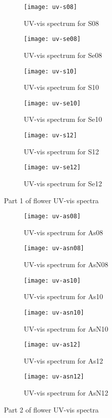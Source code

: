 \begin{figure*}[h]
\centering
\begin{subfigure}{8.25cm}\centering\texttt{[image: uv-s08]}\caption{UV-vis spectrum for S08}\end{subfigure}%
\begin{subfigure}{8.25cm}\centering\texttt{[image: uv-se08]}\caption{UV-vis spectrum for Se08}\end{subfigure}
\begin{subfigure}{8.25cm}\centering\texttt{[image: uv-s10]}\caption{UV-vis spectrum for S10}\end{subfigure}%
\begin{subfigure}{8.25cm}\centering\texttt{[image: uv-se10]}\caption{UV-vis spectrum for Se10}\end{subfigure}
\begin{subfigure}{8.25cm}\centering\texttt{[image: uv-s12]}\caption{UV-vis spectrum for S12}\end{subfigure}%
\begin{subfigure}{8.25cm}\centering\texttt{[image: uv-se12]}\caption{UV-vis spectrum for Se12}\end{subfigure}
\caption[Part 1 of flower UV-vis spectra]{Part 1 of flower UV-vis spectra}
\end{figure*}

\newpage

\begin{figure*}[h]
\centering
\begin{subfigure}{8.25cm}\centering\texttt{[image: uv-as08]}\caption{UV-vis spectrum for As08}\end{subfigure}%
\begin{subfigure}{8.25cm}\centering\texttt{[image: uv-asn08]}\caption{UV-vis spectrum for AsN08}\end{subfigure}
\begin{subfigure}{8.25cm}\centering\texttt{[image: uv-as10]}\caption{UV-vis spectrum for As10}\end{subfigure}%
\begin{subfigure}{8.25cm}\centering\texttt{[image: uv-asn10]}\caption{UV-vis spectrum for AsN10}\end{subfigure}
\begin{subfigure}{8.25cm}\centering\texttt{[image: uv-as12]}\caption{UV-vis spectrum for As12}\end{subfigure}%
\begin{subfigure}{8.25cm}\centering\texttt{[image: uv-asn12]}\caption{UV-vis spectrum for AsN12}\end{subfigure}
\caption[Part 2 of flower UV-vis spectra]{Part 2 of flower UV-vis spectra}
\end{figure*}

